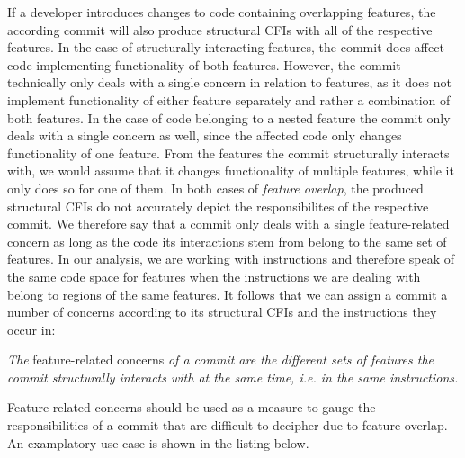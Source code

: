 If a developer introduces changes to code containing overlapping features, the according commit will also produce structural CFIs with all of the respective features.
In the case of structurally interacting features, the commit does affect code implementing functionality of both features.
However, the commit technically only deals with a single concern in relation to features, as it does not implement functionality of either feature separately and rather a combination of both features.
In the case of code belonging to a nested feature the commit only deals with a single concern as well, since the affected code only changes functionality of one feature.
From the features the commit structurally interacts with, we would assume that it changes functionality of multiple features, while it only does so for one of them.
In both cases of \emph{feature overlap}, the produced structural CFIs do not accurately depict the responsibilites of the respective commit.
We therefore say that a commit only deals with a single feature-related concern as long as the code its interactions stem from belong to the same set of features.
In our analysis, we are working with instructions and therefore speak of the same code space for features when the instructions we are dealing with belong to regions of the same features.
It follows that we can assign a commit a number of concerns according to its structural CFIs and the instructions they occur in:
\begin{definition} \label{def:commit_concerns}
\emph{The} feature-related concerns \emph{of a commit are the different sets of features the commit structurally interacts with at the same time, i.e. in the same instructions.}
\end{definition}
Feature-related concerns should be used as a measure to gauge the responsibilities of a commit that are difficult to decipher due to feature overlap. 
An examplatory use-case is shown in the listing below. \\
                             
